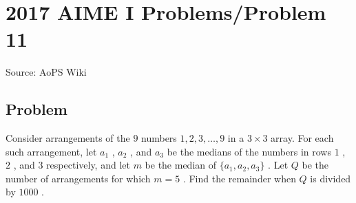 \documentclass[12pt]{article}
\begin{document}
\section*{{2017 AIME I Problems/Problem 11}}
Source: AoPS Wiki

\subsection*{Problem}
Consider arrangements of the $9$ numbers $1, 2, 3, \dots, 9$ in a $3 \times 3$ array. For each such arrangement, let $a_1$ , $a_2$ , and $a_3$ be the medians of the numbers in rows $1$ , $2$ , and $3$ respectively, and let $m$ be the median of $\{a_1, a_2, a_3\}$ . Let $Q$ be the number of arrangements for which $m = 5$ . Find the remainder when $Q$ is divided by $1000$ .
\end{document}
